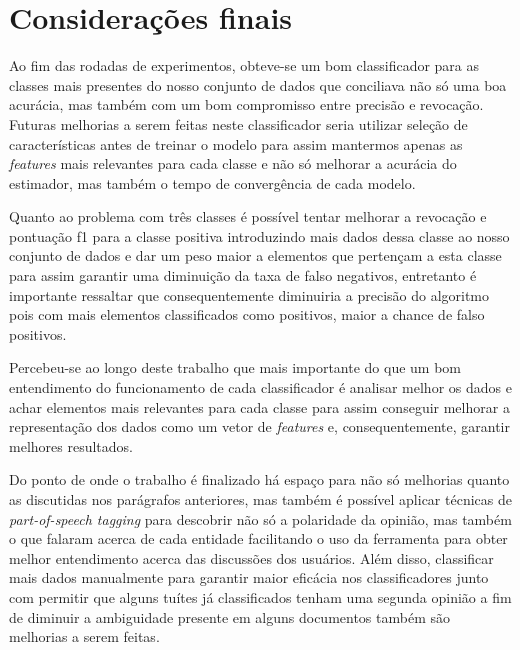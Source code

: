 \chapter{Considerações finais}

Ao fim das rodadas de experimentos, obteve-se um bom classificador
para as classes mais presentes do nosso conjunto de dados que conciliava
não só uma boa acurácia, mas também com um bom compromisso entre precisão e
revocação. Futuras melhorias a serem feitas neste classificador seria utilizar
seleção de características antes de treinar o modelo para assim mantermos apenas
as \textit{features} mais relevantes para cada classe e não só melhorar a acurácia
do estimador, mas também o tempo de convergência de cada modelo.

Quanto ao problema com três classes é possível tentar melhorar a revocação e pontuação
f1 para a classe positiva introduzindo mais dados dessa classe ao nosso conjunto de dados
e dar um peso maior a elementos que pertençam a esta classe para assim garantir uma diminuição
da taxa de falso negativos, entretanto é importante ressaltar que consequentemente diminuiria
a precisão do algoritmo pois com mais elementos classificados como positivos, maior a chance
de falso positivos.

Percebeu-se ao longo deste trabalho que mais importante do que um bom entendimento
do funcionamento de cada classificador é analisar melhor os dados e achar elementos
mais relevantes para cada classe para assim conseguir melhorar a representação dos dados
como um vetor de \textit{features} e, consequentemente, garantir melhores resultados.

Do ponto de onde o trabalho é finalizado há espaço para não só melhorias quanto as discutidas
nos parágrafos anteriores, mas também é possível aplicar técnicas de \textit{part-of-speech tagging}
para descobrir não só a polaridade da opinião, mas também o que falaram acerca de cada entidade
facilitando o uso da ferramenta para obter melhor entendimento acerca das discussões dos usuários.
Além disso, classificar mais dados manualmente para garantir maior eficácia nos classificadores
junto com permitir que alguns tuítes já classificados tenham uma segunda opinião a fim de
diminuir a ambiguidade presente em alguns documentos também são melhorias a serem feitas.
